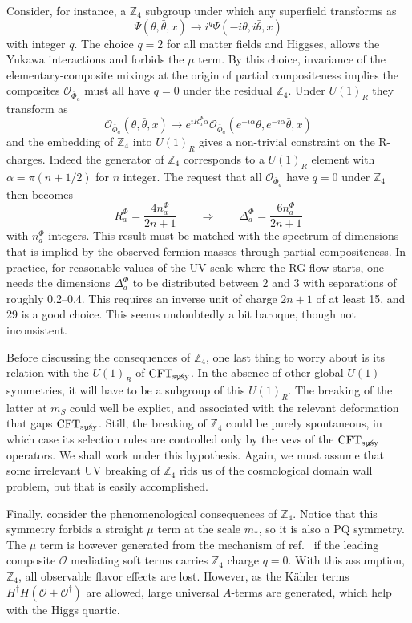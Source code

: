 \documentclass[a4paper,12pt]{article}
\newcommand{\be}{\begin{equation}}
\newcommand{\ee}{\end{equation}}
\def\O{\mathcal{O}}
\def\CFTs{{\rm CFT}_ {{\rm susy}\! \! \! \! \! \! \! \!\diagup \,\,\,}}
\begin{document}
{{{{Consider, for instance, a ${\mathbb Z}_4$ subgroup under which any superfield transforms as
\be
\Psi(\theta,\bar \theta,x) \to i^q \Psi(-i\theta,i\bar \theta,x)
\ee
with integer $q$. The choice $q=2$ for all matter fields and Higgses, allows the Yukawa interactions and forbids the $\mu$ term.
By this choice, invariance of the elementary-composite mixings at the origin of partial compositeness implies the composites $\O_{{\bar \Phi}_a}$ must all have $q=0$ under the residual ${\mathbb Z}_4$. Under $U(1)_R$ they transform as
\be
\O_{{\bar \Phi}_a}(\theta,\bar\theta,x)\to e^{iR^\Phi_a  \alpha}\O_{{\bar \Phi}_a}(e^{-i\alpha}\theta,e^{-i\alpha}\bar\theta,x)
\ee
and the embedding of ${\mathbb Z}_4$ into $U(1)_R$ gives a non-trivial constraint on the R-charges. Indeed the generator of ${\mathbb Z}_4$ corresponds to a $U(1)_R$ element with 
$\alpha= \pi(n+1/2)$ for $n$ integer.  The request that all $\O_{{\bar \Phi}_a}$ have $q=0$ under ${\mathbb Z}_4$ then becomes
\be
R^\Phi_a  =\frac{4 n^\Phi_a }{2n+1} \qquad \Rightarrow \qquad \Delta^\Phi_a =\frac{6 n^\Phi_a }{2n+1}
\label{rational}
\ee
with $n^\Phi_a $ integers. This result must be matched with the spectrum of dimensions that is 
implied by the observed fermion masses through partial compositeness. In practice, for reasonable values of the UV scale
where the RG flow starts, one needs the dimensions $\Delta^\Phi_a$ to be distributed between 2 and 3 with separations of roughly 0.2--0.4. This requires an inverse unit of charge $2n+1$ of at least 15, and 29 is a good choice. This seems undoubtedly a bit baroque, though not inconsistent.

Before discussing the consequences of ${\mathbb Z}_4$, one last thing to worry about is its relation with the $U(1)_R$ of ${\CFTs}$. In the absence of other global $U(1)$ symmetries, it will have to be a subgroup of this $U(1)_R$. The breaking of the latter at $m_S$ could well be explict, and associated with the relevant deformation that gaps ${\CFTs}$. Still, the breaking of ${\mathbb Z}_4$ could be purely spontaneous, in which case its selection rules are controlled only by the vevs of the ${\CFTs}$ operators. We shall work under this hypothesis. Again, we must assume that some irrelevant UV breaking of 
${\mathbb Z}_4$ rids us of the cosmological domain wall problem, but that is easily accomplished.

Finally, consider the phenomenological consequences of ${\mathbb Z}_4$. Notice that this symmetry forbids a straight $\mu$ term at the scale $m_*$, so it is also a PQ symmetry. The $\mu$ term is however generated from the mechanism of ref.~\cite{Giudice:1988yz}
if the leading composite $\O$  mediating soft terms carries ${\mathbb Z}_4$ charge $q=0$. With this assumption,
 ${\mathbb Z}_4$, all observable flavor effects are lost. However, as the K\"ahler terms $H^\dagger H(\O+\O^\dagger)$ are allowed, large universal $A$-terms are generated, which help with the Higgs quartic. 
 
}}}}
\end{document}
